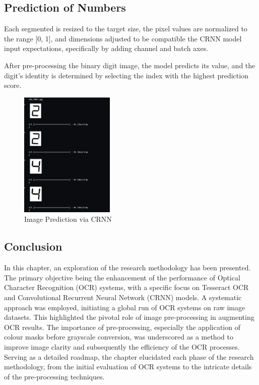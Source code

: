 \subsection{Prediction of Numbers}

Each segmented is resized to the target size, the pixel values are normalized to the range [0, 1], and dimensions adjusted to be compatible the CRNN model input expectations, specifically by adding channel and batch axes.

After pre-processing the binary digit image, the model predicts its value, and the digit's identity is determined by selecting the index with the highest prediction score.

\begin{figure}[ht]
    \centering
    \includegraphics[width=0.4\textwidth]{Figures/Results/crnn/sample_predict.jpg}
    \caption[Image Prediction via CRNN]{Image Prediction via CRNN}
    \label{fig:Image Prediction via CRNN}
\end{figure}



\newpage

\subsection{Conclusion}

In this chapter, an exploration of the research methodology has been presented. The primary objective being the enhancement of the performance of Optical Character Recognition (OCR) systems, with a specific focus on Tesseract OCR and Convolutional Recurrent Neural Network (CRNN) models. A systematic approach was employed, initiating a global run of OCR systems on raw image datasets. This highlighted the pivotal role of image pre-processing in augmenting OCR results. The importance of pre-processing, especially the application of colour masks before grayscale conversion, was underscored as a method to improve image clarity and subsequently the efficiency of the OCR processes. Serving as a detailed roadmap, the chapter elucidated each phase of the research methodology, from the initial evaluation of OCR systems to the intricate details of the pre-processing techniques.


